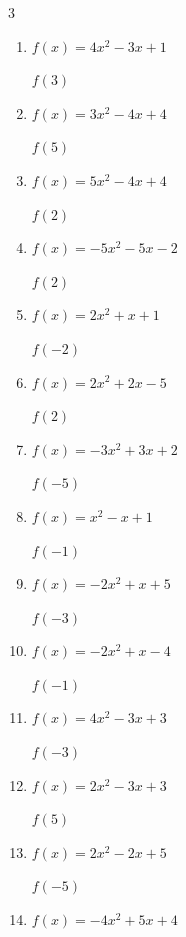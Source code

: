 \begin{multicols}{3}
\begin{enumerate}
$f(4)$
        \phantom{$= 60$}

  \item $f(x)=4x^{2}-3x+1$

$f(3)$
        \phantom{$= 28$}

  \item $f(x)=3x^{2}-4x+4$

$f(5)$
        \phantom{$= 59$}

  \item $f(x)=5x^{2}-4x+4$

$f(2)$
        \phantom{$= 16$}

  \item $f(x)=-5x^{2}-5x-2$

$f(2)$
        \phantom{$= -32$}

  \item $f(x)=2x^{2}+x+1$

$f(-2)$
        \phantom{$= 7$}

  \item $f(x)=2x^{2}+2x-5$

$f(2)$
        \phantom{$= 7$}

  \item $f(x)=-3x^{2}+3x+2$

$f(-5)$
        \phantom{$= -88$}

  \item $f(x)=x^{2}-x+1$

$f(-1)$
        \phantom{$= 3$}

  \item $f(x)=-2x^{2}+x+5$

$f(-3)$
        \phantom{$= -16$}

  \item $f(x)=-2x^{2}+x-4$

$f(-1)$
        \phantom{$= -7$}

\columnbreak %

\resetques

  \item $f(x)=4x^{2}-3x+3$

$f(-3)$
        \phantom{$= 48$}

  \item $f(x)=2x^{2}-3x+3$

$f(5)$
        \phantom{$= 38$}

  \item $f(x)=2x^{2}-2x+5$

$f(-5)$
        \phantom{$= 65$}

  \item $f(x)=-4x^{2}+5x+4$


\end{enumerate}
\end{multicols}
